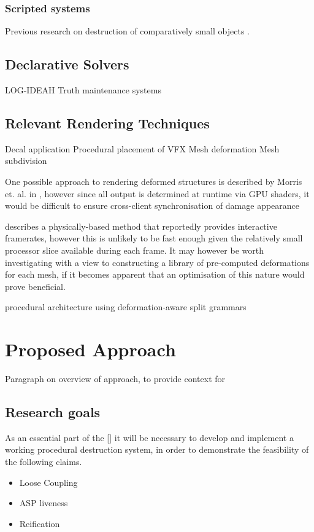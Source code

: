 \documentclass[11pt]{report}
\begin{document}
		\subsection{Scripted systems}

		Previous research on destruction of comparatively small objects \cite{van2011procedural}.
	\section{Declarative Solvers}
		LOG-IDEAH \cite{novelli2012log}
		Truth maintenance systems

	\section{Relevant Rendering Techniques}
		Decal application
		Procedural placement of VFX
		Mesh deformation
		Mesh subdivision

		One possible approach to rendering deformed structures is described by Morris et. al. in \cite{morris2012modular}, however since all output is determined at runtime via GPU shaders, it would be difficult to ensure cross-client synchronisation of damage appearance

		\cite{stegmayr2008procedural} describes a physically-based method that reportedly provides interactive framerates, however this is unlikely to be fast enough given the relatively small processor slice available during each frame. It may however be worth investigating with a view to constructing a library of pre-computed deformations for each mesh, if it becomes apparent that an optimisation of this nature would prove beneficial.

		procedural architecture using deformation-aware split grammars \cite{zmugg2013procedural}

\chapter{Proposed Approach}
	Paragraph on overview of approach, to provide context for
	\section{Research goals}
	As an essential part of the [] it will be necessary to develop and implement a working procedural destruction system, in order to demonstrate the feasibility of the following claims.
	\begin{itemize}
		\item Loose Coupling
		\item ASP liveness
		\item Reification
	\end{itemize}
\end{document}
